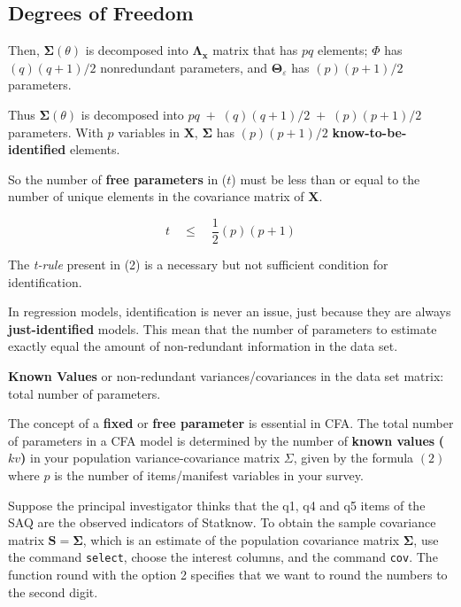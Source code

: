 \documentclass[
]{article}
\begin{document}
\hypertarget{degrees-of-freedom}{%
\subsection{Degrees of Freedom}\label{degrees-of-freedom}}

Then, \(\mathbf{\Sigma}(\theta)\) is decomposed into
\(\mathbf{\Lambda_{x}}\) matrix that has \(pq\) elements; \(\Phi\) has
\((q)(q+1)/2\) nonredundant parameters, and
\(\mathbf{\Theta}_{\varepsilon}\) has \((p)(p+1)/2\) parameters.

Thus \(\mathbf{\Sigma}(\theta)\) is decomposed into
\(pq\; +\; (q)(q+1)/2 \;+\;(p)(p+1)/2\) parameters. With \(p\) variables
in \(\mathbf{X}\), \(\mathbf{\Sigma}\) has \((p)(p+1)/2\)
\textbf{know-to-be-identified} elements.

So the number of \textbf{free parameters} in (\(t\)) must be less than
or equal to the number of unique elements in the covariance matrix of
\(\mathbf{X}\).

\[
\tag{2}
t \quad \leq \quad \frac{1}{2}(p)(p+1)  
\]

The \emph{t-rule} present in (2) is a necessary but not sufficient
condition for identification.

In regression models, identification is never an issue, just because
they are always \textbf{just-identified} models. This mean that the
number of parameters to estimate exactly equal the amount of
non-redundant information in the data set.

\textbf{Known Values} or non-redundant variances/covariances in the data
set matrix: total number of parameters.

The concept of a \textbf{fixed} or \textbf{free parameter} is essential
in CFA. The total number of parameters in a CFA model is determined by
the number of \textbf{known values } \textbf{(\(kv\))} in your
population variance-covariance matrix \(\Sigma\), given by the formula
\((2)\) where \(p\) is the number of items/manifest variables in your
survey.

Suppose the principal investigator thinks that the q1, q4 and q5 items
of the SAQ are the observed indicators of Statknow. To obtain the sample
covariance matrix \(\mathbf{S}=\mathbf{\Sigma}\), which is an estimate
of the population covariance matrix \(\mathbf{\Sigma}\), use the command
\texttt{select}, choose the interest columns, and the command
\texttt{cov}. The function round with the option 2 specifies that we
want to round the numbers to the second digit.
\end{document}
